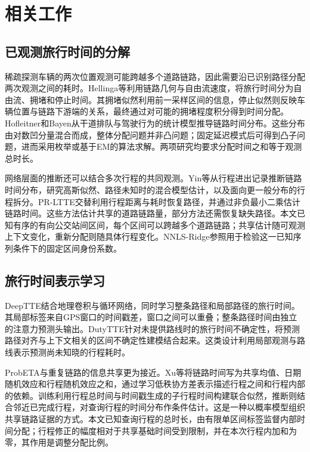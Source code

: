 \section{相关工作}
\subsection{已观测旅行时间的分解}
稀疏探测车辆的两次位置观测可能跨越多个道路链路，因此需要沿已识别路径分配两次观测之间的耗时。Hellinga等利用链路几何与自由流速度，将旅行时间分为自由流、拥堵和停止时间\cite{hellinga2008}。其拥堵似然利用前一采样区间的信息，停止似然则反映车辆位置与链路下游端的关系，最终通过对可能的拥堵程度积分得到时间分配。Hofleitner和Bayen从干道排队与驾驶行为的统计模型推导链路时间分布\cite{hofleitner2011}。这些分布由对数凹分量混合而成，整体分配问题并非凸问题；固定延迟模式后可得到凸子问题，进而采用枚举或基于EM的算法求解。两项研究均要求分配时间之和等于观测总时长。

网络层面的推断还可以结合多次行程的共同观测。Yin等从行程进出记录推断链路时间分布，研究高斯似然、路径未知时的混合模型估计，以及面向更一般分布的行程拆分\cite{yin2015entryexit}。PR-LTTE交替利用行程距离与耗时恢复路径，并通过非负最小二乘估计链路时间\cite{sun2022prltte}。这些方法估计共享的道路链路量，部分方法还需恢复缺失路径。本文已知有序的有向公交站间区间，每个区间可以跨越多个道路链路；共享估计随可观测上下文变化，重新分配则随具体行程变化。NNLS-Ridge参照用于检验这一已知序列条件下的固定区间身份系数。

\subsection{旅行时间表示学习}
DeepTTE结合地理卷积与循环网络，同时学习整条路径和局部路径的旅行时间\cite{wang2018deeptte}。其局部标签来自GPS窗口的时间戳差，窗口之间可以重叠；整条路径时间由独立的注意力预测头输出。DutyTTE针对未提供路线时的旅行时间不确定性，将预测路径对齐与上下文相关的区间不确定性建模结合起来\cite{mao2025dutytte}。这类设计利用局部观测与路线表示预测尚未知晓的行程耗时。

ProbETA与重复链路的信息共享更为接近\cite{xu2025probeta}。Xu等将链路时间写为共享均值、日期随机效应和行程随机效应之和，通过学习低秩协方差表示描述行程之间和行程内部的依赖。训练利用行程总时间与时间戳生成的子行程时间构建联合似然，推断则结合邻近已完成行程，对查询行程的时间分布作条件估计。这是一种以概率模型组织共享链路证据的方式。本文已知查询行程的总时长，由有限单区间标签监督内部时间分配；行程修正的幅度相对于共享基础时间受到限制，并在本次行程内加和为零，其作用是调整分配比例。

